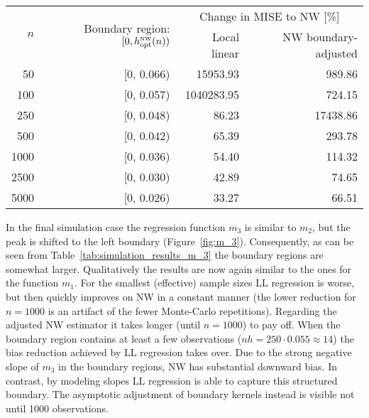 \begin{table}
	\centering
	\label{tab:simulation_results_m_2}
	\begin{tabular}{r r r r}
		\toprule
		\multirow{2}[1]{*}{$n$} & \multirow{2}[1]{*}{Boundary region: $[0, h_{\text{opt}}^{\textup{\tiny NW}}(n))$} & \multicolumn{2}{c}{Change in MISE to NW [\%]} \\
		\cmidrule(lr){3-4}
		& & Local linear & NW boundary-adjusted \\
		\midrule
		50   & [0, 0.066) &   15953.93 &   989.86 \\
		100  & [0, 0.057) & 1040283.95 &   724.15 \\
		250  & [0, 0.048) & 	 86.23 & 17438.86 \\
		500  & [0, 0.042) & 	 65.39 &   293.78 \\
		1000 & [0, 0.036) & 	 54.40 &   114.32 \\
		2500 & [0, 0.030) & 	 42.89 &    74.65 \\
		5000 & [0, 0.026) & 	 33.27 &    66.51 \\
		\bottomrule
	\end{tabular}	
\end{table}

In the final simulation case the regression function $m_3$ is similar to $m_2$, but the peak is shifted to the left boundary (Figure~\ref{fig:m_3}).
Consequently, as can be seen from Table~\ref{tab:simulation_results_m_3} the boundary regions are somewhat larger.
Qualitatively the results are now again similar to the ones for the function $m_1$.
For the smallest (effective) sample sizes LL regression is worse, but then quickly improves on NW in a constant manner
(the lower reduction for $n = 1000$ is an artifact of the fewer Monte-Carlo repetitions).
Regarding the adjusted NW estimator it takes longer (until $n = 1000$) to pay off.
When the boundary region contains at least a few observations ($nh = 250 \cdot 0.055 \approx 14$) the bias reduction achieved by LL regression takes over.
Due to the strong negative slope of $m_3$ in the boundary regions, NW has substantial downward bias.
In contrast, by modeling slopes LL regression is able to capture this structured boundary.
The asymptotic adjustment of boundary kernels instead is visible not until 1000 observations.

